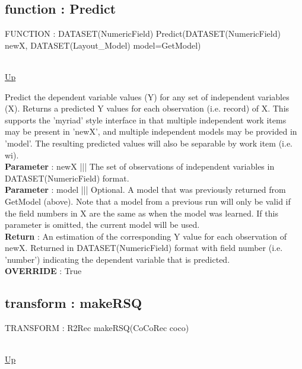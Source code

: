 \subsection*{function : Predict}
\hypertarget{ecldoc:linearregression.ols.predict}{FUNCTION : DATASET(NumericField) Predict(DATASET(NumericField) newX, DATASET(Layout\_Model) model=GetModel)} \\
\hyperlink{ecldoc:linearregression.ols}{Up} \\
\par
Predict the dependent variable values (Y) for any set of independent variables (X). Returns a predicted Y values for each observation (i.e. record) of X. This supports the 'myriad' style interface in that multiple independent work items may be present in 'newX', and multiple independent models may be provided in 'model'. The resulting predicted values will also be separable by work item (i.e. wi). \\
\textbf{Parameter} : newX ||| The set of observations of independent variables in DATASET(NumericField) format. \\
\textbf{Parameter} : model ||| Optional. A model that was previously returned from GetModel (above). Note that a model from a previous run will only be valid if the field numbers in X are the same as when the model was learned. If this parameter is omitted, the current model will be used. \\
\textbf{Return} : An estimation of the corresponding Y value for each observation of newX. Returned in DATASET(NumericField) format with field number (i.e. 'number') indicating the dependent variable that is predicted. \\
\textbf{OVERRIDE} : True \\
\subsection*{transform : makeRSQ}
\hypertarget{ecldoc:linearregression.ols.makersq}{TRANSFORM : R2Rec makeRSQ(CoCoRec coco)} \\
\hyperlink{ecldoc:linearregression.ols}{Up} \\
\par
